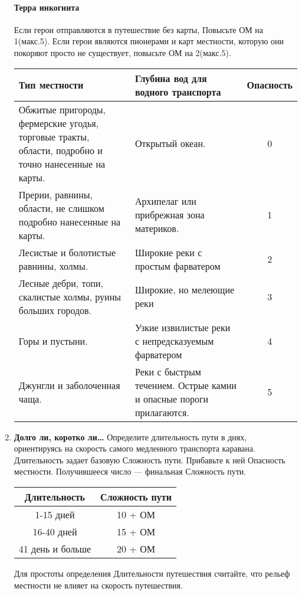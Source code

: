 \begin{enumerate}
\begin{tcolorbox}
\paragraph{Терра инкогнита} Если герои отправляются в путешествие без карты, Повысьте ОМ на 1(макс.5). Если герои являются пионерами и карт местности, которую они покоряют просто не существует, повысьте ОМ на 2(макс.5).
\end{tcolorbox}
\begin{center}
\begin{tabular}{|p{7cm}|p{7cm}|c|}
\hline
Тип местности & Глубина вод для водного транспорта & Опасность \\ \hline
Обжитые пригороды, фермерские угодья, торговые тракты, области, подробно и точно нанесенные на карты. & Открытый океан. & 0 \\ \hline
Прерии, равнины, области, не слишком подробно нанесенные на карты. & Архипелаг или прибрежная зона материков. & 1 \\ \hline
Лесистые и болотистые равнины, холмы. & Широкие реки с простым фарватером & 2 \\ \hline
Лесные дебри, топи, скалистые холмы, руины больших городов. & Широкие, но мелеющие реки & 3 \\ \hline
Горы и пустыни. & Узкие извилистые реки с непредсказуемым фарватером & 4 \\ \hline
Джунгли и заболоченная чаща. & Реки с быстрым течением. Острые камни и опасные пороги прилагаются. & 5 \\ \hline
\end{tabular}
\end{center}
\item \textbf{Долго ли, коротко ли…} Определите длительность пути в днях, ориентируясь на скорость самого медленного транспорта каравана. Длительность задает базовую Сложность пути. Прибавьте к ней Опасность местности. Получившееся число — финальная Сложность пути.
\begin{center}
\begin{tabular}{|c|c|}
\hline
Длительность & Сложность пути \\ \hline
1-15 дней & 10 + ОМ \\ \hline
16-40 дней & 15 + ОМ \\ \hline
41 день и больше & 20 + ОМ \\ \hline
\end{tabular}
\end{center}
\begin{tcolorbox}
Для простоты определения Длительности путешествия считайте, что рельеф местности не влияет на скорость путешествия.

\end{tcolorbox}
\end{enumerate}
